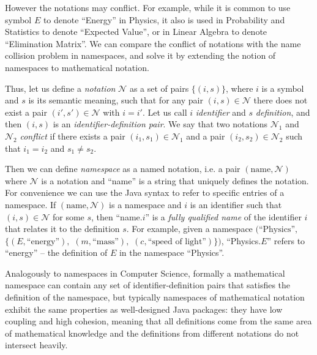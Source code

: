 
However the notations may conflict. For example, while it is common to use 
symbol $E$ to denote ``Energy'' in Physics, it also is used in Probability and 
Statistics to denote ``Expected Value'', or in Linear Algebra to denote 
``Elimination Matrix''. 
We can compare the conflict of notations with the name collision problem in namespaces,
and solve it by extending the notion of namespaces to mathematical notation. 

Thus, let us define a \emph{notation} $\mathcal N$ as a set of pairs $\{ (i, s) \}$,
where $i$ is a symbol and $s$ is its semantic meaning,
such that for any pair $(i, s) \in \mathcal N$ there does not exist a pair 
$(i', s') \in \mathcal N$ with $i = i'$. 
Let us call $i$  \emph{identifier} and $s$ \emph{definition}, and 
then $(i, s)$ is an \emph{identifier-definition pair}.
We say that two notations $\mathcal N_1$ and $\mathcal N_2$
\emph{conflict} if there exists a pair $(i_1, s_1) \in \mathcal N_1$ and a pair
$(i_2, s_2) \in \mathcal N_2$ such that $i_1 = i_2$ and $s_1 \ne s_2$. 

Then we can define \emph{namespace} as a named notation, i.e. a pair 
$(\text{name}, \mathcal N)$ where $\mathcal N$ is a notation and ``name'' is
a string that uniquely defines the notation. For convenience we can use 
the Java syntax to refer to specific entries of a namespace. If 
$(\text{name}, \mathcal N)$ is a namespace and $i$ is an identifier such that 
$(i, s) \in \mathcal N$ for some $s$, then ``name.$i$'' is a 
\emph{fully qualified name} of the identifier $i$ that relates it to the 
definition $s$. For example, 
given a namespace $\big( \text{``Physics''},$ $\{ (E, \text{``energy''}),$ 
$(m, \text{``mass''}),$ $(c, \text{``speed of light''}) \} \big)$, 
``Physics.$E$'' refers to ``energy'' -- the definition of $E$ in the 
namespace ``Physics''. 


Analogously to namespaces in Computer Science, formally a mathematical namespace 
can contain any set of identifier-definition pairs that satisfies the definition of 
the namespace, but typically namespaces of mathematical notation
exhibit the same properties as well-designed Java packages: they 
have low coupling and high cohesion, meaning that all definitions 
come from the same area of mathematical knowledge and the definitions 
from different notations do not intersect heavily. 

